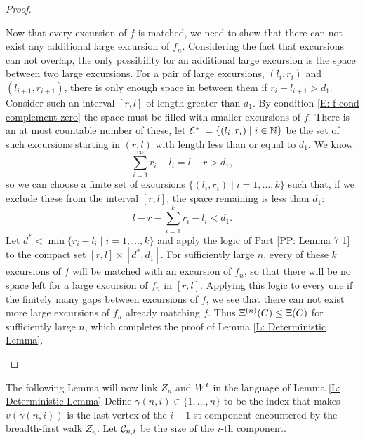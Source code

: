\begin{proof}
\begin{proofpart}
Now that every excursion of $f$ is matched, 
we need to show that there can not exist any additional large excursion of $f_n$.
Considering the fact that excursions can not overlap,
the only possibility for an additional large excursion is the space between two large excursions.
For a pair of large excursions,
$(l_i, r_i)$ and $(l_{i+1}, r_{i+1})$,
there is only enough space in between them if
$r_i - l_{i+1} > d_1$.
Consider such an interval $[r,l]$ of length greater than $d_1$.
By condition \eqref{E: f cond complement zero} the space must be filled with smaller excursions of $f$.
There is an at most countable number of these,
let $\mathcal{E^*} := \{ (l_i, r_i) \; | \; i \in \mathbb{N} \}$
be the set of such excursions starting in $(r,l)$ with length less than or equal to $d_1$.
We know
\begin{equation}
\sum_{i=1}^{\infty} r_i - l_i = l - r > d_1,
\end{equation}
so we can choose a finite set of excursions
$\{ (l_i, r_i) \; | \; i = 1, \dots, k \}$
such that, 
if we exclude these from the interval $[r,l]$, 
the space remaining is less than $d_1$:
\begin{equation}
l-r - \sum_{i=1}^{k} r_i - l_i < d_1.
\end{equation}
Let $d^* < \min \{ r_i - l_i \; | \; i = 1, \dots, k \}$
and apply the logic of Part \ref{PP: Lemma 7 1} to the compact set
$[r, l] \times [d^*, d_1]$.
For sufficiently large $n$, 
every of these $k$ excursions of $f$ will be matched with an excursion of $f_n$,
so that there will be no space left for a large excursion of $f_n$ in $[r,l]$.
Applying this logic to every one if the finitely many gaps between excursions of $f$,
we see that there can not exist more large excursions of $f_n$ already matching $f$.
Thus $\Xi^{(n)}(C) \leq \Xi(C)$ for sufficiently large $n$,
which completes the proof of Lemma \ref{L: Deterministic Lemma}.
\end{proofpart}

	
\end{proof}


The following Lemma will now link $Z_n$ and $W^t$ in the language of Lemma \ref{L: Deterministic Lemma}
Define $\gamma (n, i) \in \{1, \dots, n\}$ to be the index that makes
$v(\gamma(n,i))$ is the last vertex of the $i-1$-st component encountered by the breadth-first walk $Z_n$.
Let $\mathcal{C}_{n,i}$ be the size of the $i$-th component.

